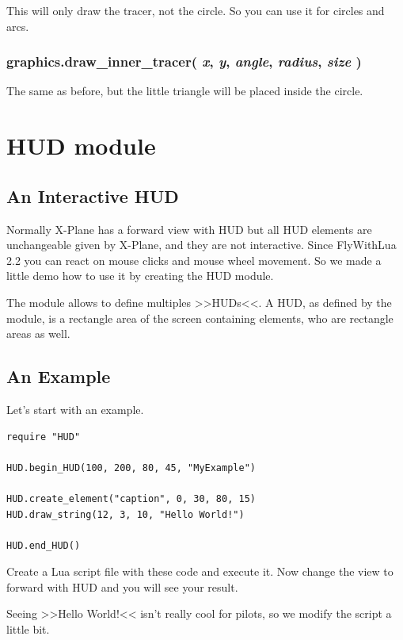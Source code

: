 \documentclass[11pt,parskip=half,a4paper]{scrartcl}
\begin{document}
This will only draw the tracer, not the circle. So you can use it for circles and arcs.

\subsubsection{graphics.draw\_inner\_tracer( \emph{x}, \emph{y}, \emph{angle}, \emph{radius}, \emph{size} )}

The same as before, but the little triangle will be placed inside the circle.

\newpage
\section{HUD module}

\subsection{An Interactive HUD}

Normally X-Plane has a forward view with HUD but all HUD elements are unchangeable given by X-Plane, and they are not interactive. Since FlyWithLua 2.2 you can react on mouse clicks and mouse wheel movement. So we made a little demo how to use it by creating the HUD module.

The module allows to define multiples >>HUDs<<. A HUD, as defined by the module, is a rectangle area of the screen containing elements, who are rectangle areas as well.

\subsection{An Example}

Let's start with an example.

\begin{lstlisting}[firstnumber=1]
require "HUD"

HUD.begin_HUD(100, 200, 80, 45, "MyExample")

HUD.create_element("caption", 0, 30, 80, 15)
HUD.draw_string(12, 3, 10, "Hello World!")

HUD.end_HUD()
\end{lstlisting}

Create a Lua script file with these code and execute it. Now change the view to forward with HUD and you will see your result.

Seeing >>Hello World!<< isn't really cool for pilots, so we modify the script a little bit.
\end{document}
